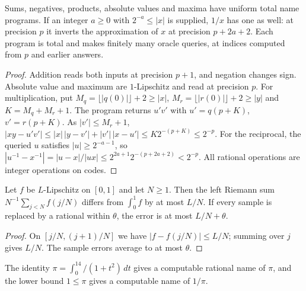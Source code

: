 \begin{proposition}\label{prop:efd-closure}
Sums, negatives, products, absolute values and maxima have uniform total name programs. If an integer $a\ge0$
with $2^{-a}\le|x|$ is supplied, $1/x$ has one as well: at precision $p$ it inverts the approximation of $x$ at
precision $p+2a+2$. Each program is total and makes finitely many oracle queries, at indices computed from $p$ and earlier
answers.
\end{proposition}

\begin{proof}
Addition reads both inputs at precision $p+1$, and negation changes sign. Absolute value and maximum are $1$-Lipschitz and read at precision $p$. For multiplication, put $M_q=\lfloor|q(0)|\rfloor+2\ge|x|$, $M_r=\lfloor|r(0)|\rfloor+2\ge|y|$ and $K=M_q+M_r+1$. The program returns $u'v'$ with $u'=q(p+K)$, $v'=r(p+K)$. As $|v'|\le M_r+1$, $|xy-u'v'|\le|x|\,|y-v'|+|v'|\,|x-u'|\le K2^{-(p+K)}\le2^{-p}$. For the reciprocal, the queried $u$ satisfies $|u|\ge2^{-a-1}$, so $|u^{-1}-x^{-1}|=|u-x|/|ux|\le2^{2a+1}2^{-(p+2a+2)}<2^{-p}$. All rational operations are integer operations on codes.
\end{proof}

\begin{lemma}[Quadrature]\label{lem:efd-quadrature}
Let $f$ be $L$-Lipschitz on $[0,1]$ and let $N\ge1$. Then the left Riemann sum
$N^{-1}\sum_{j<N}f(j/N)$ differs from $\int_0^1f$ by at most $L/N$. If every sample is replaced by a rational within $\theta$, the error is at most
$L/N+\theta$.
\end{lemma}

\begin{proof}
On $[j/N,(j+1)/N]$ we have $|f-f(j/N)|\le L/N$; summing over $j$ gives $L/N$. The sample errors average to at most $\theta$.
\end{proof}

\begin{lemma}[A name of $\pi$]\label{lem:efd-pi}
The identity $\pi=\int_0^14/(1+t^2)\,dt$ gives a computable rational name of $\pi$, and the lower bound $1\le\pi$
gives a computable name of $1/\pi$.
\end{lemma}

